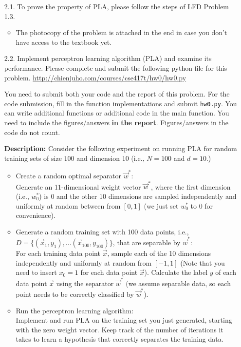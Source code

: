 \documentclass[11pt]{article}
\begin{document}
\begin{enumerate}
\begin{itemize}
\item[2.1.] To prove the property of PLA, please follow the steps of LFD Problem 1.3.
\begin{itemize}
    \item The photocopy of the problem is attached in the end in case you don't have access to the textbook yet.
\end{itemize}

\item[2.2.]
  Implement perceptron learning algorithm (PLA) and examine its performance. 
  Please complete and submit the following python file for this problem. 
  \url{http://chienjuho.com/courses/cse417t/hw0/hw0.py}
  
  You need to submit both your code and the report of this problem. 
  For the code submission, fill in the function implementations and submit \texttt{hw0.py}. You can write additional functions or additional code in the main function.
  You need to include the figures/answers \textbf{in the report}. Figures/answers in the code do not count.
  
  \textbf{Description:} Consider the following experiment on running PLA for random training sets of size $100$ and dimension $10$ (i.e., $N=100$ and $d=10$.)
  \begin{itemize}
  \item Create a random optimal separator $\vec{w}^*$:\\
    Generate an 11-dimensional weight vector $\vec{w}^*$,
    where the first dimension (i.e., $w^*_0$) is 0 and the other 10 dimensions are
    sampled independently and uniformly at random between from $[0,1]$
    (we just set $w^*_0$ to 0 for convenience).
  \item Generate a random training set with 100 data points, i.e., $D=\{(\vec{x}_1,y_1),...(\vec{x}_{100},y_{100})\}$, that are separable by $\vec{w}^*$:\\
  For each training data point $\vec{x}$, sample each of the 10 dimensions independently and uniformly at random from $[-1,1]$ (Note that you need to insert $x_0=1$ for each data point $\vec{x}$).
    Calculate the label $y$ of each data point $\vec{x}$ using the separator $\vec{w}^*$ (we assume separable data, so each point needs to be correctly classified by $\vec{w}^*$).
  \item Run the perceptron learning algorithm:\\ 
    Implement and run PLA on the training set you just generated, 
    starting with the zero weight vector. 
    Keep track of the number of iterations it takes to learn a hypothesis
    that correctly separates the training data. 
  \end{itemize}


\end{itemize}
\end{enumerate}
\end{document}
